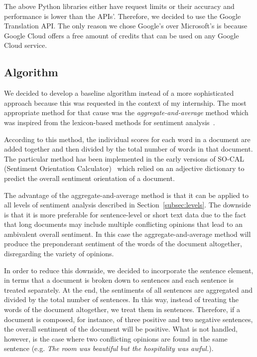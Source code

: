 The above Python libraries either have request limits
or their accuracy and performance is lower than the APIs'.
Therefore, we decided to use the Google Translation API.
The only reason we chose Google's over Microsoft's is
because Google Cloud offers a free amount of credits
that can be used on any Google Cloud service.

\subsection{Algorithm}
\label{subsec:algorithm}

We decided to develop a baseline algorithm instead of a more sophisticated approach
because this was requested in the context of my internship.
The most appropriate method for that cause was the \emph{aggregate-and-average} method
which was inspired from the lexicon-based methods for sentiment analysis~\cite{TBTV11}.

According to this method,
the individual scores for each word in a document are added together
and then divided by the total number of words in that document.
The particular method has been implemented
in the early versions of SO-CAL (Sentiment Orientation Calculator)~\cite{TG04,TAV06} which relied on an adjective dictionary
to predict the overall sentiment orientation of a document.

The advantage of the aggregate-and-average method is
that it can be applied to all levels of sentiment analysis
described in Section~\ref{subsec:levels}.
The downside is that it is more preferable for sentence-level or short text data
due to the fact that long documents may include multiple conflicting opinions
that lead to an ambivalent overall sentiment.
In this case the aggregate-and-average method will produce the preponderant
sentiment of the words of the document altogether,
disregarding the variety of opinions.

In order to reduce this downside,
we decided to incorporate the sentence element,
in terms that a document is broken down to sentences
and each sentence is treated separately.
At the end, the sentiments of all sentences are aggregated
and divided by the total number of sentences.
In this way,
instead of treating the words of the document altogether,
we treat them in sentences.
Therefore,
if a document is composed, for instance, of three positive and two negative sentences,
the overall sentiment of the document will be positive.
What is not handled, however,
is the case where two conflicting opinions are found in the same sentence
(e.g. \emph{The room was beautiful but the hospitality was awful.}).

